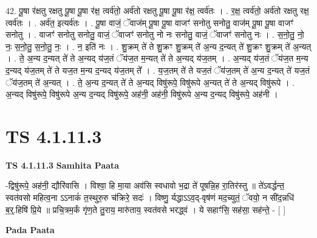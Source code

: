 \documentclass[17pt]{extarticle}
\begin{document}
42. पू॒षा र॑क्षतु रक्षतु पू॒षा पू॒षा र॑क्ष॒ त्वर्व॑तो॒ अर्व॑तो रक्षतु पू॒षा पू॒षा र॑क्ष॒ त्वर्व॑तः । . र॒क्ष॒ त्वर्व॑तो॒ अर्व॑तो रक्षतु रक्ष॒ त्वर्व॑तः । . अर्व॑त॒ इत्यर्व॑तः । . पू॒षा वाजं॒ ॅवाज॑म् पू॒षा पू॒षा वाजꣳ॑ सनोतु सनोतु॒ वाज॑म् पू॒षा पू॒षा वाजꣳ॑ सनोतु । . वाजꣳ॑ सनोतु सनोतु॒ वाजं॒ ॅवाजꣳ॑ सनोतु नो नः सनोतु॒ वाजं॒ ॅवाजꣳ॑ सनोतु नः । . स॒नो॒तु॒ नो॒ नः॒ स॒नो॒तु॒ स॒नो॒तु॒ नः॒ । . न॒ इति॑ नः । . शु॒क्रम् ते॑ ते शु॒क्रꣳ शु॒क्रम् ते॑ अ॒न्य द॒न्यत् ते॑ शु॒क्रꣳ शु॒क्रम् ते॑ अ॒न्यत् । . ते॒ अ॒न्य द॒न्यत् ते॑ ते अ॒न्यद् य॑ज॒तं ॅय॑ज॒त म॒न्यत् ते॑ ते अ॒न्यद् य॑ज॒तम् । . अ॒न्यद् य॑ज॒तं ॅय॑ज॒त म॒न्य द॒न्यद् य॑ज॒तम् ते॑ ते यज॒त म॒न्य द॒न्यद् य॑ज॒तम् ते᳚ । . य॒ज॒तम् ते॑ ते यज॒तं ॅय॑ज॒तम् ते॑ अ॒न्य द॒न्यत् ते॑ यज॒तं ॅय॑ज॒तम् ते॑ अ॒न्यत् । . ते॒ अ॒न्य द॒न्यत् ते॑ ते अ॒न्यद् विषु॑रूपे॒ विषु॑रूपे अ॒न्यत् ते॑ ते अ॒न्यद् विषु॑रूपे । . अ॒न्यद् विषु॑रूपे॒ विषु॑रूपे अ॒न्य द॒न्यद् विषु॑रूपे॒ अह॑नी॒ अह॑नी॒ विषु॑रूपे अ॒न्य द॒न्यद् विषु॑रूपे॒ अह॑नी । \newline
\pagebreak
{}

\section{ TS 4.1.11.3 }

\textbf{TS 4.1.11.3 } \newline
\textbf{Samhita Paata} \newline

-द्विषु॑रूपे॒ अह॑नी॒ द्यौरि॑वासि । विश्वा॒ हि मा॒या अव॑सि स्वधावो भ॒द्रा ते॑ पूषन्नि॒ह रा॒तिर॑स्तु ॥ ते॑ऽवर्द्धन्त॒ स्वत॑वसो महित्व॒ना ऽऽनाकं॑ त॒स्थुरु॒रु च॑क्रिरे॒ सदः॑ । विष्णु॒ र्यद्धाऽऽव॒द्-वृष॑णं मद॒च्युतं॒ ॅवयो॒ न सी॑द॒न्नधि॑ ब॒र्॒.हिषि॑ प्रि॒ये ॥ प्रचि॒त्रम॒र्कं गृ॑ण॒ते तु॒राय॒ मारु॑ताय॒ स्वत॑वसे भरद्ध्वं । ये सहाꣳ॑सि॒ सह॑सा॒ सह॑न्ते॒ - [  ] \newline

\textbf{Pada Paata} \newline
\end{document}
